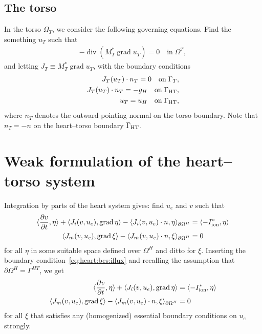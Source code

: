 \documentclass[a4paper, reqno]{amsart}
\DeclareMathOperator{\Div}{div}
\DeclareMathOperator{\Grad}{grad}
\newcommand{\inner}[2]{\langle #1, #2 \rangle}
\newcommand{\ddt}[1]{\frac{\partial #1}{\partial t}}
\numberwithin{equation}{section}
\newcommand{\heart}{\Omega^H}
\newcommand{\torso}{\Omega^T}
\begin{document}
\subsection{The torso}

In the torso $\Omega_T$, we consider the following governing
equations. Find the something $u_T$ such that
\begin{align}
 - \Div (M_T^{\ast} \Grad u_T) = 0 \quad \text{in} \; \torso,
\end{align}
and letting $J_T \equiv M_T^{\ast} \Grad u_T$, with the boundary
conditions
\begin{align}
  \label{eq:torso:bcs:gammaT}
  J_T(u_T) \cdot n_T = 0 \quad \text{on} \; \Gamma_T, \\
  \label{eq:torso:bcs:gammaHT}
  J_T(u_T) \cdot n_T = - g_H \quad \text{on} \; \Gamma_{\rm{HT}}, \\
  u_T = u_H \quad \text{on} \; \Gamma_{\rm{HT}},
\end{align}
where $n_T$ denotes the outward pointing normal on the torso
boundary. Note that $n_T = - n$ on the heart--torso boundary
$\Gamma_{\rm{HT}}$.

\section{Weak formulation of the heart--torso system}

Integration by parts of the heart system gives: find $u_e$ and $v$
such that
\begin{align}
\inner{\ddt{v}}{\eta}
+ \inner{J_i(v, u_e)}{\Grad \eta}
- \inner{J_i(v, u_e) \cdot n}{\eta}_{\partial \heart}
&= \inner{- I^\ast_{\rm{ion}}}{\eta} \\
\inner{J_m(v, u_e)}{\Grad \xi}
- \inner{J_m(v, u_e) \cdot n}{\xi}_{\partial \heart}
&= 0
\end{align}
for all $\eta$ in some suitable space defined over $\heart$ and ditto
for $\xi$. Inserting the boundary condition~\eqref{eq:heart:bcs:iflux}
and recalling the assumption that $\partial \Omega^H = \Gamma^{HT}$,
we get
\begin{align}
\inner{\ddt{v}}{\eta}
+ \inner{J_i(v, u_e)}{\Grad \eta}
&= \inner{- I^\ast_{\rm{ion}}}{\eta} \\
\inner{J_m(v, u_e)}{\Grad \xi}
- \inner{J_m(v, u_e) \cdot n}{\xi}_{\partial \heart}
&= 0
\end{align}
for all $\xi$ that satisfies any (homogenized) essential boundary
conditions on $u_e$ strongly.
\end{document}
